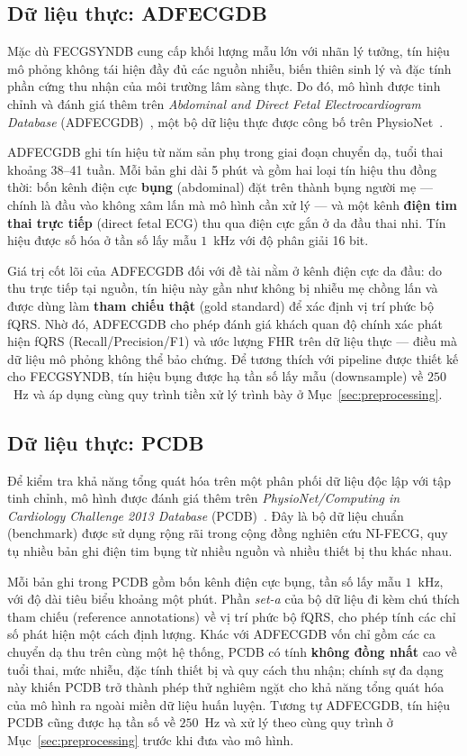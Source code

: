 \documentclass[../DoAn.tex]{subfiles}
\begin{document}
\subsection{Dữ liệu thực: ADFECGDB}
\label{sec:dataset_adfecgdb}
Mặc dù FECGSYNDB cung cấp khối lượng mẫu lớn với nhãn lý tưởng, tín hiệu mô phỏng không tái hiện đầy đủ các nguồn nhiễu, biến thiên sinh lý và đặc tính phần cứng thu nhận của môi trường lâm sàng thực. Do đó, mô hình được tinh chỉnh và đánh giá thêm trên \textit{Abdominal and Direct Fetal Electrocardiogram Database} (ADFECGDB)~\cite{jezewskiDeterminationFetalHeart2012}, một bộ dữ liệu thực được công bố trên PhysioNet~\cite{PhysioBankPhysioToolkitPhysioNet}.

ADFECGDB ghi tín hiệu từ năm sản phụ trong giai đoạn chuyển dạ, tuổi thai khoảng 38--41 tuần. Mỗi bản ghi dài 5 phút và gồm hai loại tín hiệu thu đồng thời: bốn kênh điện cực \textbf{bụng} (abdominal) đặt trên thành bụng người mẹ --- chính là đầu vào không xâm lấn mà mô hình cần xử lý --- và một kênh \textbf{điện tim thai trực tiếp} (direct fetal ECG) thu qua điện cực gắn ở da đầu thai nhi. Tín hiệu được số hóa ở tần số lấy mẫu $1$~kHz với độ phân giải 16 bit.

Giá trị cốt lõi của ADFECGDB đối với đề tài nằm ở kênh điện cực da đầu: do thu trực tiếp tại nguồn, tín hiệu này gần như không bị nhiễu mẹ chồng lấn và được dùng làm \textbf{tham chiếu thật} (gold standard) để xác định vị trí phức bộ fQRS. Nhờ đó, ADFECGDB cho phép đánh giá khách quan độ chính xác phát hiện fQRS (Recall/Precision/F1) và ước lượng FHR trên dữ liệu thực --- điều mà dữ liệu mô phỏng không thể bảo chứng. Để tương thích với pipeline được thiết kế cho FECGSYNDB, tín hiệu bụng được hạ tần số lấy mẫu (downsample) về $250$~Hz và áp dụng cùng quy trình tiền xử lý trình bày ở Mục~\ref{sec:preprocessing}.

\subsection{Dữ liệu thực: PCDB}
\label{sec:dataset_pcdb}
Để kiểm tra khả năng tổng quát hóa trên một phân phối dữ liệu độc lập với tập tinh chỉnh, mô hình được đánh giá thêm trên \textit{PhysioNet/Computing in Cardiology Challenge 2013 Database} (PCDB)~\cite{beharNoninvasiveFECGExtraction2013}. Đây là bộ dữ liệu chuẩn (benchmark) được sử dụng rộng rãi trong cộng đồng nghiên cứu NI-FECG, quy tụ nhiều bản ghi điện tim bụng từ nhiều nguồn và nhiều thiết bị thu khác nhau.

Mỗi bản ghi trong PCDB gồm bốn kênh điện cực bụng, tần số lấy mẫu $1$~kHz, với độ dài tiêu biểu khoảng một phút. Phần \textit{set-a} của bộ dữ liệu đi kèm chú thích tham chiếu (reference annotations) về vị trí phức bộ fQRS, cho phép tính các chỉ số phát hiện một cách định lượng. Khác với ADFECGDB vốn chỉ gồm các ca chuyển dạ thu trên cùng một hệ thống, PCDB có tính \textbf{không đồng nhất} cao về tuổi thai, mức nhiễu, đặc tính thiết bị và quy cách thu nhận; chính sự đa dạng này khiến PCDB trở thành phép thử nghiêm ngặt cho khả năng tổng quát hóa của mô hình ra ngoài miền dữ liệu huấn luyện. Tương tự ADFECGDB, tín hiệu PCDB cũng được hạ tần số về $250$~Hz và xử lý theo cùng quy trình ở Mục~\ref{sec:preprocessing} trước khi đưa vào mô hình.
\end{document}
